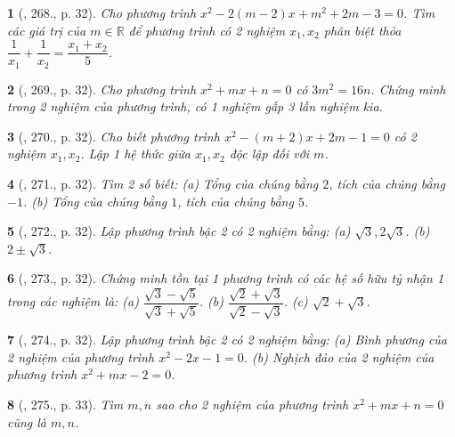 \documentclass{article}
\newtheorem{baitoan}{}
\begin{document}
\begin{baitoan}[\cite{Binh_Toan_9_tap_2}, 268., p. 32]
	Cho phương trình $x^2 - 2(m - 2)x + m^2 + 2m - 3 = 0$. Tìm các giá trị của $m\in\mathbb{R}$ để phương trình có 2 nghiệm $x_1,x_2$ phân biệt thỏa $\dfrac{1}{x_1} + \dfrac{1}{x_2} = \dfrac{x_1 + x_2}{5}$.
\end{baitoan}

\begin{baitoan}[\cite{Binh_Toan_9_tap_2}, 269., p. 32]
	Cho phương trình $x^2 + mx + n = 0$ có $3m^2 = 16n$. Chứng minh trong 2 nghiệm của phương trình, có 1 nghiệm gấp 3 lần nghiệm kia.
\end{baitoan}

\begin{baitoan}[\cite{Binh_Toan_9_tap_2}, 270., p. 32]
	Cho biết phương trình $x^2 - (m + 2)x + 2m - 1 = 0$ có 2 nghiệm $x_1,x_2$. Lập 1 hệ thức giữa $x_1,x_2$ độc lập đối với $m$.
\end{baitoan}

\begin{baitoan}[\cite{Binh_Toan_9_tap_2}, 271., p. 32]
	Tìm 2 số biết: (a) Tổng của chúng bằng $2$, tích của chúng bằng $-1$. (b) Tổng của chúng bằng $1$, tích của chúng bằng $5$.
\end{baitoan}

\begin{baitoan}[\cite{Binh_Toan_9_tap_2}, 272., p. 32]
	Lập phương trình bậc 2 có 2 nghiệm bằng: (a) $\sqrt{3},2\sqrt{3}$. (b) $2\pm\sqrt{3}$.
\end{baitoan}

\begin{baitoan}[\cite{Binh_Toan_9_tap_2}, 273., p. 32]
	Chứng minh tồn tại 1 phương trình có các hệ số hữu tỷ nhận 1 trong các nghiệm là: (a) $\dfrac{\sqrt{3} - \sqrt{5}}{\sqrt{3} + \sqrt{5}}$. (b) $\dfrac{\sqrt{2} + \sqrt{3}}{\sqrt{2} - \sqrt{3}}$. (c) $\sqrt{2} + \sqrt{3}$.
\end{baitoan}

\begin{baitoan}[\cite{Binh_Toan_9_tap_2}, 274., p. 32]
	Lập phương trình bậc 2 có 2 nghiệm bằng: (a) Bình phương của 2 nghiệm của phương trình $x^2 - 2x - 1 = 0$. (b) Nghịch đảo của 2 nghiệm của phương trình $x^2 + mx - 2 = 0$.
\end{baitoan}

\begin{baitoan}[\cite{Binh_Toan_9_tap_2}, 275., p. 33]
	Tìm $m,n$ sao cho 2 nghiệm của phương trình $x^2 + mx + n = 0$ cũng là $m,n$.
\end{baitoan}
\end{document}
